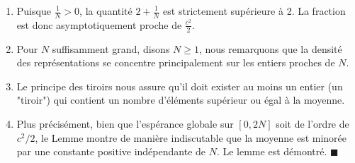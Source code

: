 \documentclass[12pt,a4paper]{article}
\begin{document}
\begin{enumerate}
    $$\mu \ge \frac{c^2}{2 + \frac{1}{N}}$$
    \item Puisque $\frac{1}{N} > 0$, la quantité $2 + \frac{1}{N}$ est strictement supérieure à 2. La fraction est donc asymptotiquement proche de $\frac{c^2}{2}$.
    \item Pour $N$ suffisamment grand, disons $N \ge 1$, nous remarquons que la densité des représentations se concentre principalement sur les entiers proches de $N$.
    \item Le principe des tiroirs nous assure qu'il doit exister au moins un entier (un "tiroir") qui contient un nombre d'éléments supérieur ou égal à la moyenne.
    \item Plus précisément, bien que l'espérance globale sur $[0, 2N]$ soit de l'ordre de $c^2/2$, le Lemme montre de manière indiscutable que la moyenne est minorée par une constante positive indépendante de $N$. Le lemme est démontré. $\blacksquare$
\end{enumerate}
\end{document}
